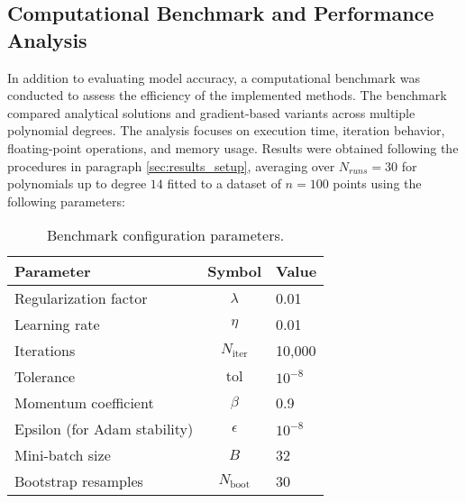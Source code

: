 \documentclass[
 reprint,            %
 amsmath,amssymb,
 aps,
]{revtex4-2}
\begin{document}
\subsection{Computational Benchmark and Performance Analysis}
\label{sec:Computational_Benchmark}
In addition to evaluating model accuracy, a computational benchmark was conducted to assess the efficiency of the implemented methods.
The benchmark compared analytical solutions and gradient-based variants across multiple polynomial degrees.
The analysis focuses on execution time, iteration behavior, floating-point operations, and memory usage.
Results were obtained following the procedures in paragraph \ref{sec:results_setup}, averaging over 
 \(N_{runs} = 30\) for polynomials up to degree \(14\) fitted to a dataset of \(n = 100\) points using the following parameters:

\begin{table}[H]
\centering
\caption{Benchmark configuration parameters.}
\label{tab:benchmark_params}
\begin{tabular}{lcl}
\toprule
\textbf{Parameter} & \textbf{Symbol} & \textbf{Value} \\
\midrule
Regularization factor & $\lambda$ & 0.01 \\
Learning rate & $\eta$ & 0.01 \\
Iterations & $N_{\text{iter}}$ & 10,000 \\
Tolerance & $\text{tol}$ & $10^{-8}$ \\
Momentum coefficient & $\beta$ & 0.9 \\
Epsilon (for Adam stability) & $\epsilon$ & $10^{-8}$ \\
Mini-batch size & $B$ & 32 \\
Bootstrap resamples & $N_{\text{boot}}$ & 30 \\
\bottomrule
\end{tabular}
\end{table}
\end{document}
